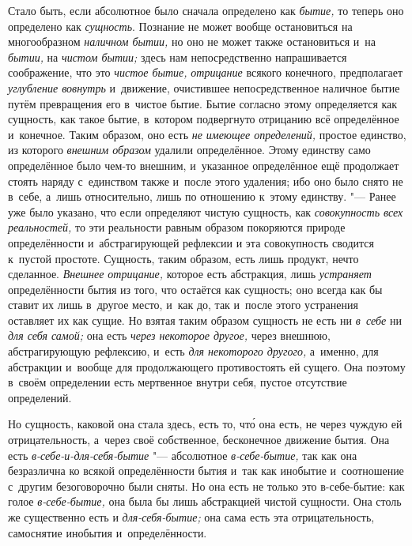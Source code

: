 Стало быть, если абсолютное было сначала определено как
{\em бытие,} то теперь оно определено как
{\em сущность}. Познание не может вообще остановиться
на многообразном {\em наличном бытии,} но оно не может
также остановиться и~на {\em бытии,} на
{\em чистом бытии;} здесь нам непосредственно
напрашивается соображение, что это {\em чистое бытие,}
{\em отрицание} всякого конечного, предполагает
{\em углубление вовнутрь} и~движение, очистившее
непосредственное наличное бытие путём превращения его в~чистое бытие. Бытие
согласно этому определяется как сущность, как такое бытие, в~котором
подвергнуто отрицанию всё определённое и~конечное. Таким образом, оно есть
{\em не имеющее определений,} простое единство, из
которого {\em внешним образом} удалили определённое.
Этому единству само определённое было чем-то внешним, и~указанное
определённое ещё продолжает стоять наряду с~единством также и~после этого
удаления; ибо оно было снято не в~себе, а~лишь относительно, лишь по
отношению к~этому единству. "--- Ранее
уже было указано, что если определяют чистую сущность, как
{\em совокупность всех реальностей,} то эти реальности
равным образом покоряются природе определённости и~абстрагирующей рефлексии
и эта совокупность сводится к~пустой простоте. Сущность, таким образом,
есть лишь продукт, нечто сделанное. {\em Внешнее
отрицание,} которое есть абстракция, лишь
{\em устраняет} определённости бытия из того, что
остаётся как сущность; оно
всегда как бы ставит их лишь в~другое место, и~как до, так и~после этого
устранения оставляет их как сущие. Но взятая таким образом сущность не есть
ни {\em в~себе} ни {\em для себя самой;} она есть {\em через некоторое другое,}
через внешнюю, абстрагирующую рефлексию, и~есть {\em для
некоторого другого,} а~именно, для абстракции и~вообще для продолжающего
противостоять ей сущего. Она поэтому в~своём определении есть мертвенное
внутри себя, пустое отсутствие определений.

Но сущность, каковой она стала здесь, есть то, чт\'{о} она есть, не через чуждую
ей отрицательность, а~через своё собственное, бесконечное движение бытия.
Она есть {\em в-себе-и-для-себя-бытие} "--- абсолютное
{\em в-себе-бытие,} так как она безразлична ко всякой
определённости бытия и~так как инобытие и~соотношение с~другим
безоговорочно были сняты. Но она есть не только это в-себе-бытие: как голое
{\em в-себе-бытие,} она была бы лишь абстракцией чистой
сущности. Она столь же существенно есть и
{\em для-себя-бытие;} она сама есть эта
отрицательность, самоснятие инобытия и~определённости.

